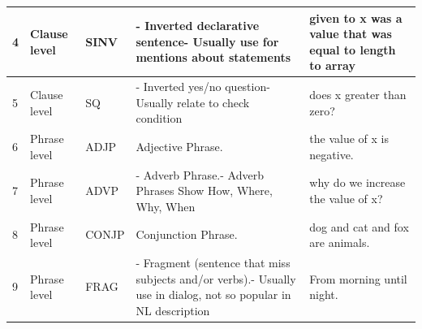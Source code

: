 \begin{longtable}{|p{}|p{}|p{}|p{}|p{}|}
		\rowcolor[HTML]{9AFF99} 
		4                                                         & Clause level                                                & SINV                                                       & - Inverted declarative sentence- Usually use for mentions about statements                                      & given to x was a value that was equal to length to array                        \\ \hline
		\rowcolor[HTML]{9AFF99} 
		5                                                         & Clause level                                                & SQ                                                         & - Inverted yes/no question- Usually relate to check condition                                                   & does x greater than zero?                                                       \\ \hline
		\rowcolor[HTML]{FFCCC9} 
		6                                                         & Phrase level                                                & ADJP                                                       & Adjective Phrase.                                                                                               & the value of x is negative.                                                     \\ \hline
		\rowcolor[HTML]{FFCCC9} 
		7                                                         & Phrase level                                                & ADVP                                                       & - Adverb Phrase.- Adverb Phrases Show How, Where, Why, When                                                     & why do we increase the value of x?                                              \\ \hline
		\rowcolor[HTML]{FFCCC9} 
		8                                                         & Phrase level                                                & CONJP                                                      & Conjunction Phrase.                                                                                             & dog and cat and fox are animals.                                                \\ \hline
		\rowcolor[HTML]{FFFFC7} 
		9                                                         & Phrase level                                                & FRAG                                                       & - Fragment (sentence that miss subjects and/or verbs).- Usually use in dialog, not so popular in NL description & From morning until night.                                                       \\ \hline

\end{longtable}
